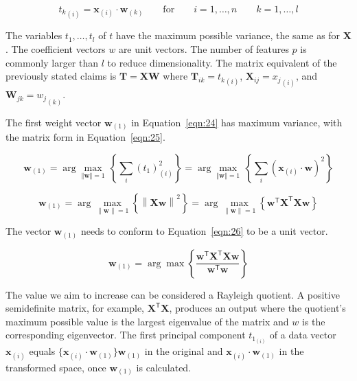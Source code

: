 \documentclass[preprint,12pt]{elsarticle}
\begin{document}
\begin{equation}
	{t_{k}}_{\left(i\right)}=\mathbf{x}_{\left(i\right)}\cdot \mathbf{w}_{\left(k\right)}\qquad \mathrm{for} \qquad i=1,\dots ,n\qquad k=1,\dots ,l
	\label{eqn:23}
\end{equation}

The variables $t_{1},\dots ,t_{l}$ of $t$ have the maximum possible variance, the same as for $\mathbf{X}$. The coefficient vectors $w$ are unit vectors. The number of features $p$ is commonly larger than $l$ to reduce dimensionality. The matrix equivalent of the previously stated claims is $\mathbf{T}=\mathbf{X} \mathbf{W}$ where ${\mathbf{T}}_{ik}={t_{k}}_{\left(i\right)}$, ${\mathbf{X}}_{ij}={x_{j}}_{\left(i\right)}$, and ${\mathbf{W}}_{jk}={w_{j}}_{\left(k\right)}$.

The first weight vector $\mathbf{w}_{\left(1\right)}$ in Equation~\ref{eqn:24} has maximum variance, with the matrix form in Equation~\ref{eqn:25}.

\begin{equation}
	\mathbf{w}_{\left(1\right)}=\arg \max_{\Vert \mathbf{w} \Vert =1}\,\left\{\sum_{i}(t_{1})_{\left(i\right)}^{2}\right\}=\arg \max_{\Vert \mathbf{w} \Vert =1}\,\left\{\sum_{i}\left(\mathbf{x}_{\left(i\right)}\cdot \mathbf{w} \right)^{2}\right\}
	\label{eqn:24}
\end{equation}

\begin{equation}
	\mathbf{w}_{\left(1\right)}=\arg \max_{\left\|\mathbf{w} \right\|=1}\left\{\left\|\mathbf{Xw} \right\|^{2}\right\}=\arg \max_{\left\|\mathbf{w} \right\|=1}\left\{\mathbf{w}^{\mathsf{T}}\mathbf{X}^{\mathsf{T}}\mathbf{Xw} \right\}
	\label{eqn:25}
\end{equation}

The vector $\mathbf{w}_{\left(1\right)}$ needs to conform to Equation~\ref{eqn:26} to be a unit vector.

\begin{equation}
	\mathbf{w}_{\left(1\right)}=\arg \max \left\{{\frac{\mathbf{w}^{\mathsf{T}}\mathbf{X}^{\mathsf{T}}\mathbf{Xw}}{\mathbf{w}^{\mathsf{T}}\mathbf{w}}}\right\}
	\label{eqn:26}
\end{equation}

The value we aim to increase can be considered a Rayleigh quotient. A positive semidefinite matrix, for example, $\mathbf{X}^{\mathsf{T}}\mathbf{X}$, produces an output where the quotient's maximum possible value is the largest eigenvalue of the matrix and $w$ is the corresponding eigenvector.
The first principal component  $t_{1_{\left(i\right)}}$ of a data vector $\mathbf{x}_{\left(i\right)}$ equals $\{\mathbf{x}_{\left(i\right)} \cdot \mathbf{w}_{\left(1\right)}\} \mathbf{w}_{\left(1\right)}$  in the original and $\mathbf{x}_{\left(i\right)} \cdot \mathbf{w}_{\left(1\right)}$ in the transformed space, once $\mathbf{w}_{\left(1\right)}$ is calculated.
\end{document}
